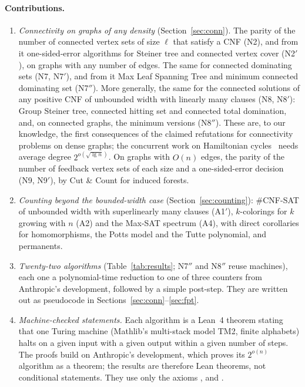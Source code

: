 \documentclass[11pt]{article}
\theoremstyle{remark}
\newcommand{\lean}[1]{\texttt{\detokenize{#1}}}
\begin{document}
\paragraph{Contributions.}
\begin{enumerate}
\item \emph{Connectivity on graphs of any density} (Section~\ref{sec:conn}). The parity of the
number of connected vertex sets of size $\ell$ that satisfy a CNF (N2), and from it one-sided-error
algorithms for Steiner tree and connected vertex cover (N2$'$), on graphs with any number of edges.
The same for connected dominating sets (N7, N7$'$), and from it Max Leaf Spanning Tree and minimum
connected dominating set (N7$''$). More generally, the same for the connected solutions of any positive
CNF of unbounded width with linearly many clauses (N8, N8$'$): Group Steiner tree, connected hitting
set and connected total domination, and, on connected graphs, the minimum versions (N8$''$). These are, to our knowledge,
the first consequences of the claimed refutations for connectivity problems on dense graphs; the
concurrent work on Hamiltonian cycles~\cite{Tul26} needs average degree $2^{o(\sqrt{\lg n})}$. On
graphs with $O(n)$ edges, the parity of the number of feedback vertex sets of each size and a
one-sided-error decision (N9, N9$'$), by Cut \& Count for induced forests.
\item \emph{Counting beyond the bounded-width case} (Section~\ref{sec:counting}): \#CNF-SAT of
unbounded width with superlinearly many clauses (A1$'$), $k$-colorings for $k$ growing with $n$ (A2)
and the Max-SAT spectrum (A4), with direct corollaries for homomorphisms, the Potts model and the
Tutte polynomial, and permanents.
\item \emph{Twenty-two algorithms} (Table~\ref{tab:results}; N7$''$ and N8$''$ reuse machines), each one a polynomial-time reduction to
one of three counters from Anthropic's development, followed by a simple post-step. They are written
out as pseudocode in Sections~\ref{sec:conn}--\ref{sec:fpt}.
\item \emph{Machine-checked statements.} Each algorithm is a Lean~4 theorem stating that one Turing
machine (Mathlib's multi-stack model TM2, finite alphabets) halts on a given input with a given
output within a given number of steps. The proofs build on Anthropic's development, which proves its
$2^{o(n)}$ algorithm as a theorem; the results are therefore Lean theorems, not conditional
statements. They use only the axioms \lean{propext}, \lean{Classical.choice} and \lean{Quot.sound}.

\end{enumerate}
\end{document}
